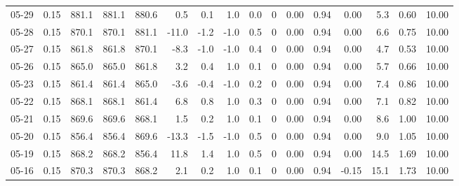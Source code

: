 \begin{threeparttable}
{\begin{tabular}{lrrrrrrrrrrrrrrr}
  05-29 &     0.15 & 881.1 & 881.1 & 880.6 &        0.5 &            0.1 &                      1.0 &                 0.0 &              0 &       0.00 &      0.94 &           0.00 &              5.3 &            0.60 &                  10.00 \\
  05-28 &     0.15 & 870.1 & 870.1 & 881.1 &      -11.0 &           -1.2 &                     -1.0 &                 0.5 &              0 &       0.00 &      0.94 &           0.00 &              6.6 &            0.75 &                  10.00 \\
  05-27 &     0.15 & 861.8 & 861.8 & 870.1 &       -8.3 &           -1.0 &                     -1.0 &                 0.4 &              0 &       0.00 &      0.94 &           0.00 &              4.7 &            0.53 &                  10.00 \\
  05-26 &     0.15 & 865.0 & 865.0 & 861.8 &        3.2 &            0.4 &                      1.0 &                 0.1 &              0 &       0.00 &      0.94 &           0.00 &              5.7 &            0.66 &                  10.00 \\
  05-23 &     0.15 & 861.4 & 861.4 & 865.0 &       -3.6 &           -0.4 &                     -1.0 &                 0.2 &              0 &       0.00 &      0.94 &           0.00 &              7.4 &            0.86 &                  10.00 \\
  05-22 &     0.15 & 868.1 & 868.1 & 861.4 &        6.8 &            0.8 &                      1.0 &                 0.3 &              0 &       0.00 &      0.94 &           0.00 &              7.1 &            0.82 &                  10.00 \\
  05-21 &     0.15 & 869.6 & 869.6 & 868.1 &        1.5 &            0.2 &                      1.0 &                 0.1 &              0 &       0.00 &      0.94 &           0.00 &              8.6 &            1.00 &                  10.00 \\
  05-20 &     0.15 & 856.4 & 856.4 & 869.6 &      -13.3 &           -1.5 &                     -1.0 &                 0.5 &              0 &       0.00 &      0.94 &           0.00 &              9.0 &            1.05 &                  10.00 \\
  05-19 &     0.15 & 868.2 & 868.2 & 856.4 &       11.8 &            1.4 &                      1.0 &                 0.5 &              0 &       0.00 &      0.94 &           0.00 &             14.5 &            1.69 &                  10.00 \\
  05-16 &     0.15 & 870.3 & 870.3 & 868.2 &        2.1 &            0.2 &                      1.0 &                 0.1 &              0 &       0.00 &      0.94 &          -0.15 &             15.1 &            1.73 &                  10.00 \\

\end{tabular}}
\end{threeparttable}
